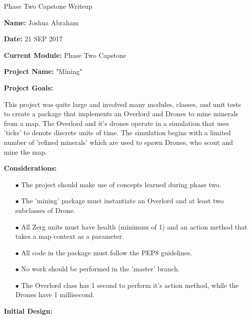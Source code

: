 \documentclass{article}
\begin{document}
\centerline{\sc \large Phase Two Capstone Writeup}
\vspace{.5pc}

\begin{flushleft}
\textbf{Name:} Joshua Abraham
\vspace{.5pc}

\textbf{Date:} 21 SEP 2017
\vspace{.5pc}

\textbf{Current Module:} Phase Two Capstone
\vspace{.5pc}

\textbf{Project Name:} "Mining"
\vspace{.5pc}

\textbf{Project Goals:}
\vspace{.5pc}
\end{flushleft}

This project was quite large and involved many modules, classes, and unit
tests to create a package that implements an Overlord and Drones to mine
minerals from a map. The Overlord and it's drones operate in a simulation
that uses 'ticks' to denote discrete units of time. The simulation begins
with a limited number of 'refined minerals' which are used to spawn Drones,
who scout and mine the map.

\begin{flushleft}
\textbf{Considerations:}
\vspace{.5pc}
\end{flushleft}

\begin{itemize}
	\item[$\bullet$] The project should make use of concepts learned during
	phase two.
	\item[$\bullet$] The 'mining' package must instantiate an Overlord and
	at least two subclasses of Drone.
	\item[$\bullet$] All Zerg units must have health (minimum of 1) and an
	action method that takes a map context as a parameter.
	\item[$\bullet$] All code in the package must follow the PEP8 guidelines.
	\item[$\bullet$] No work should be performed in the 'master' branch.
	\item[$\bullet$] The Overlord class has 1 second to perform it's action
	method, while the Drones have 1 millisecond.
\end{itemize}

\begin{flushleft}
\textbf{Initial Design:}
\vspace{.5pc}
\end{flushleft}
\end{document}
